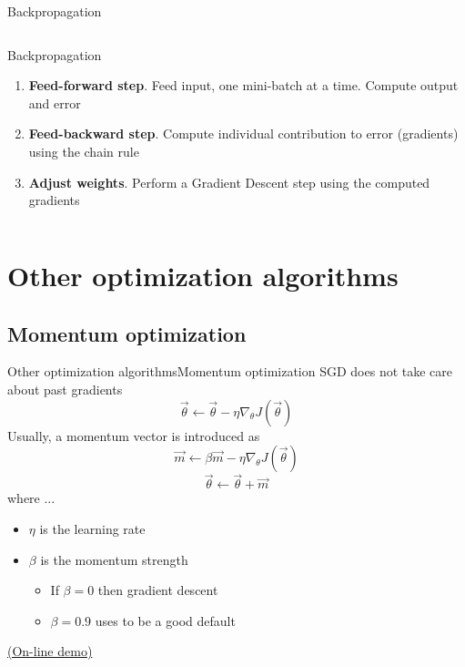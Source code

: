 \documentclass[10pt,compress]{beamer} %
\begin{document}
\begin{frame}{Backpropagation}
	\begin{columns}
	\begin{block}{Backpropagation}
	\begin{enumerate}
	\item \textbf{Feed-forward step}. Feed input, one mini-batch at a time. Compute output and error
	\item \textbf{Feed-backward step}. Compute individual contribution to error (gradients) using the chain rule
	\item \textbf{Adjust weights}. Perform a Gradient Descent step using the computed gradients
	\end{enumerate}
	\end{block}

		\centering 
	\end{columns}
\end{frame}

\section{Other optimization algorithms}
\subsection{Momentum optimization}

\begin{frame}{Other optimization algorithms}{Momentum optimization}
    SGD does not take care about past gradients
	\begin{equation*}
		\vec{\theta} \leftarrow \vec{\theta} - \eta \nabla_{\theta} J(\vec{\theta})
	\end{equation*}
    Usually, a \alert{momentum} vector is introduced as
	\begin{equation*}
		\vec{m} \leftarrow \beta \vec{m} - \eta \nabla_\theta J(\vec{\theta})
        \end{equation*}
	\begin{equation*}
		\vec{\theta} \leftarrow \vec{\theta} + \vec{m}
        \end{equation*}
    where ...
    \begin{itemize}
	\item $\eta$ is the learning rate
	\item $\beta$ is the momentum strength
		\begin{itemize}
        		\item If $\beta = 0$ then gradient descent
			\item $\beta=0.9$ uses to be a good default
		\end{itemize}
    \end{itemize}

    \href{http://distill.pub/2017/momentum/}{(On-line demo)}
\end{frame}
\end{document}
